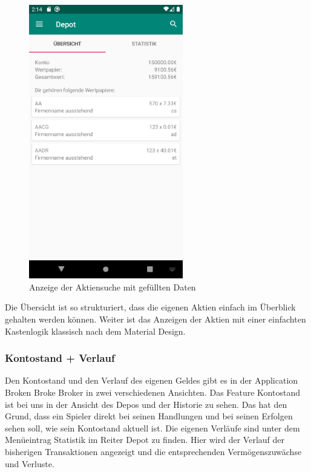\documentclass[10pt]{scrartcl}
\begin{document}
\begin{figure}[H]
	\centering
	\includegraphics[width=0.6\textwidth]{Bilder/Prsi/depot.png}
	\caption{Anzeige der Aktiensuche mit gefüllten Daten}
\end{figure}
 
Die Übersicht ist so strukturiert, dass die eigenen Aktien einfach im Überblick gehalten werden können. Weiter ist das Anzeigen der Aktien mit einer einfachten Kastenlogik klassisch nach dem Material Design.

\subsubsection{Kontostand + Verlauf}

Den Kontostand und den Verlauf des eigenen Geldes gibt es in der Application Broken Broke Broker in zwei verschiedenen Ansichten. Das Feature Kontostand ist bei uns in der Ansicht des Depos und der Historie zu sehen. Das hat den Grund, dass ein Spieler direkt bei seinen Handlungen und bei seinen Erfolgen sehen soll, wie sein Kontostand aktuell ist. Die eigenen Verläufe sind unter dem Menüeintrag Statistik im Reiter Depot zu finden. Hier wird der Verlauf der bisherigen Transaktionen angezeigt und die entsprechenden Vermögenszuwächse und Verluste. 
\end{document}
